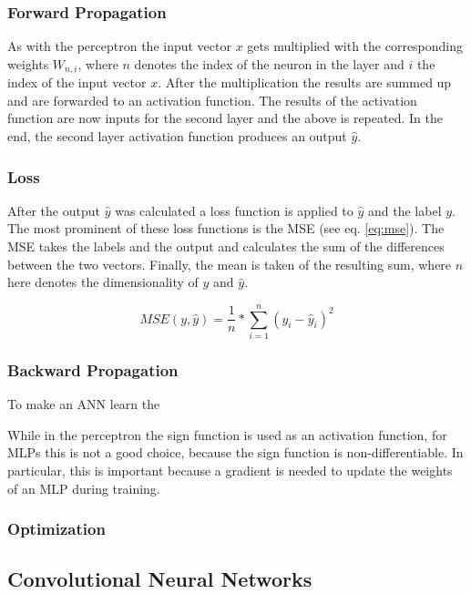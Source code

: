 \subsubsection{Forward Propagation}
As with the perceptron the input vector $x$ gets multiplied with the corresponding weights $W_{n,i}$, where $n$ denotes the index of the neuron in the layer and $i$ the index of the input vector $x$.
After the multiplication the results are summed up and are forwarded to an activation function.
The results of the activation function are now inputs for the second layer and the above is repeated.
In the end, the second layer activation function produces an output $\hat{y}$.

\subsubsection{Loss}
After the output $\hat{y}$ was calculated a loss function is applied to $\hat{y}$ and the  label $y$.
The most prominent of these loss functions is the \ac{MSE} (see eq. \ref{eq:mse}).
The \ac{MSE} takes the labels and the output and calculates the sum of the differences between the two vectors.
Finally, the mean is taken of the resulting sum, where $n$ here denotes the dimensionality of $y$ and $\hat{y}$.

\begin{equation}
    \label{eq:mse}
    MSE(y, \hat{y}) = \frac{1}{n} * \sum_{i=1}^{n}(y_i - \hat{y}_i)^2
\end{equation}

\subsubsection{Backward Propagation}

To make an \ac{ANN} learn the

While in the perceptron the sign function is used as an activation function, for \ac{MLPs} this is not a good choice, because the sign function is non-differentiable.
In particular, this is important because a gradient is needed to update the weights of an \ac{MLP} during training.



\subsubsection{Optimization}

\subsection{Convolutional Neural Networks}


